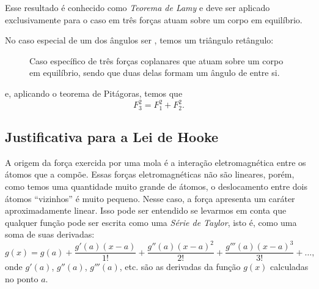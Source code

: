 \noindent{}Esse resultado é conhecido como \emph{Teorema de Lamy} e deve ser aplicado exclusivamente para o caso em três forças atuam sobre um corpo em equilíbrio.

No caso especial de um dos ângulos ser , temos um triângulo retângulo:
\begin{figure}[!h]
\centering
{}
\caption{Caso específico de três forças coplanares que atuam sobre um corpo em equilíbrio, sendo que duas delas formam um ângulo de  entre si.\label{Fig:LamyTrianguloRetangulo}}
\end{figure}

\noindent{}e, aplicando o teorema de Pitágoras, temos que
\begin{equation}
    F_3^2 = F_1^2 + F_2^2.
\end{equation}


\subsection{Justificativa para a Lei de Hooke}

A origem da força exercida por uma mola é a interação eletromagnética entre os átomos que a compõe. Essas forças eletromagnéticas não são lineares, porém, como temos uma quantidade muito grande de átomos, o deslocamento entre dois átomos ``vizinhos'' é muito pequeno. Nesse caso, a força apresenta um caráter aproximadamente linear. Isso pode ser entendido se levarmos em conta que qualquer função pode ser escrita como uma \emph{Série de Taylor}, isto é, como uma soma de suas derivadas:
\begin{equation}
	g(x) = g(a) + \frac{g'(a)(x - a)}{1!} + \frac{g''(a)(x-a)^2}{2!} + \frac{g'''(a)(x-a)^3}{3!} + \dots,
\end{equation}
onde $g'(a)$, $g''(a)$, $g'''(a)$, etc. são as derivadas da função $g(x)$ calculadas no ponto $a$.

